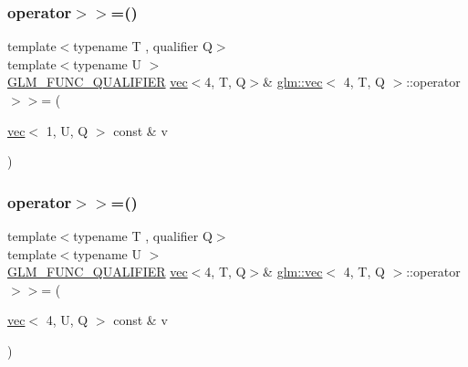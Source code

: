 \mbox{\label{structglm_1_1vec_3_014_00_01_t_00_01_q_01_4_a83a91fd4b81cc0335d4310a2aed2f713}} 
\subsubsection{\texorpdfstring{operator$>$$>$=()}{operator>>=()}\hspace{0.1cm}{\footnotesize\ttfamily [5/6]}}
{\footnotesize\ttfamily template$<$typename T , qualifier Q$>$ \\
template$<$typename U $>$ \\
\hyperlink{setup_8hpp_a33fdea6f91c5f834105f7415e2a64407}{G\+L\+M\+\_\+\+F\+U\+N\+C\+\_\+\+Q\+U\+A\+L\+I\+F\+I\+ER} \hyperlink{structglm_1_1vec}{vec}$<$4, T, Q$>$\& \hyperlink{structglm_1_1vec}{glm\+::vec}$<$ 4, T, Q $>$\+::operator$>$$>$= (\begin{DoxyParamCaption}\item[{\hyperlink{structglm_1_1vec}{vec}$<$ 1, U, Q $>$ const \&}]{v }\end{DoxyParamCaption})}

\mbox{\label{structglm_1_1vec_3_014_00_01_t_00_01_q_01_4_a44ce6a7a24c6f0b24eee2c09ae28796b}} 
\subsubsection{\texorpdfstring{operator$>$$>$=()}{operator>>=()}\hspace{0.1cm}{\footnotesize\ttfamily [6/6]}}
{\footnotesize\ttfamily template$<$typename T , qualifier Q$>$ \\
template$<$typename U $>$ \\
\hyperlink{setup_8hpp_a33fdea6f91c5f834105f7415e2a64407}{G\+L\+M\+\_\+\+F\+U\+N\+C\+\_\+\+Q\+U\+A\+L\+I\+F\+I\+ER} \hyperlink{structglm_1_1vec}{vec}$<$4, T, Q$>$\& \hyperlink{structglm_1_1vec}{glm\+::vec}$<$ 4, T, Q $>$\+::operator$>$$>$= (\begin{DoxyParamCaption}\item[{\hyperlink{structglm_1_1vec}{vec}$<$ 4, U, Q $>$ const \&}]{v }\end{DoxyParamCaption})}

